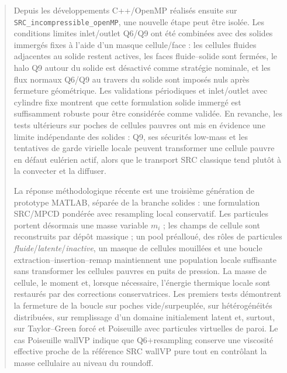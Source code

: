 \documentclass[11pt,a4paper]{article}
\begin{document}
\begin{abstract}
Depuis les développements C++/OpenMP réalisés ensuite sur \texttt{SRC\_incompressible\_openMP}, une nouvelle étape peut être isolée. Les conditions limites inlet/outlet Q6/Q9 ont été combinées avec des solides immergés fixes à l'aide d'un masque cellule/face : les cellules fluides adjacentes au solide restent actives, les faces fluide--solide sont fermées, le halo Q9 autour du solide est désactivé comme stratégie nominale, et les flux normaux Q6/Q9 au travers du solide sont imposés nuls après fermeture géométrique. Les validations périodiques et inlet/outlet avec cylindre fixe montrent que cette formulation solide immergé est suffisamment robuste pour être considérée comme validée. En revanche, les tests ultérieurs sur poches de cellules pauvres ont mis en évidence une limite indépendante des solides : Q9, ses sécurités low-mass et les tentatives de garde virielle locale peuvent transformer une cellule pauvre en défaut eulérien actif, alors que le transport SRC classique tend plutôt à la convecter et la diffuser.

La réponse méthodologique récente est une troisième génération de prototype MATLAB, séparée de la branche solides : une formulation SRC/MPCD pondérée avec resampling local conservatif. Les particules portent désormais une masse variable $m_i$ ; les champs de cellule sont reconstruits par dépôt massique ; un pool préalloué, des rôles de particules \emph{fluide}/\emph{latente}/\emph{inactive}, un masque de cellules mouillées et une boucle extraction--insertion--remap maintiennent une population locale suffisante sans transformer les cellules pauvres en puits de pression. La masse de cellule, le moment et, lorsque nécessaire, l'énergie thermique locale sont restaurés par des corrections conservatrices. Les premiers tests démontrent la fermeture de la boucle sur poches vide/surpeuplée, sur hétérogénéités distribuées, sur remplissage d'un domaine initialement latent et, surtout, sur Taylor--Green forcé et Poiseuille avec particules virtuelles de paroi. Le cas Poiseuille wallVP indique que Q6+resampling conserve une viscosité effective proche de la référence SRC wallVP pure tout en contrôlant la masse cellulaire au niveau du roundoff.



\end{abstract}
\end{document}

